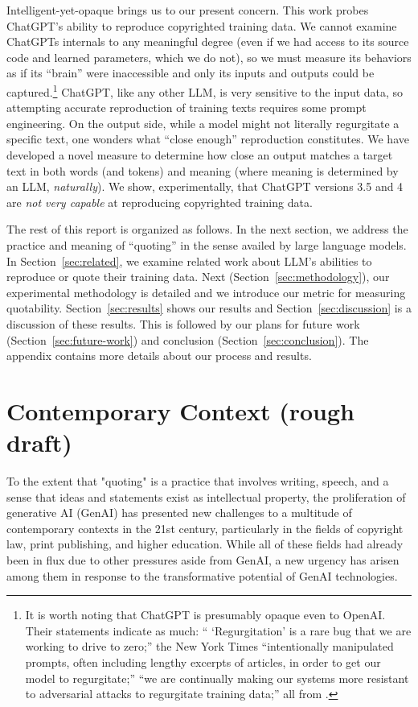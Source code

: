 \documentclass{article}
\begin{document}
Intelligent-yet-opaque brings us to our present concern. This work probes ChatGPT's ability to reproduce copyrighted training data. We cannot examine ChatGPTs internals to any meaningful degree (even if we had access to its source code and learned parameters, which we do not), so we must measure its behaviors as if its ``brain'' were inaccessible and only its inputs and outputs could be captured.\footnote{It is worth noting that ChatGPT is presumably opaque even to OpenAI. Their statements indicate as much: `` `Regurgitation' is a rare bug that we are working to drive to zero;'' the New York Times ``intentionally manipulated prompts, often including lengthy excerpts of articles, in order to get our model to regurgitate;'' ``we are continually making our systems more resistant to adversarial attacks to regurgitate training data;'' all from \cite{openaiOpenAIJournalism}.} ChatGPT, like any other LLM, is very sensitive to the input data, so attempting accurate reproduction of training texts requires some prompt engineering. On the output side, while a model might not literally regurgitate a specific text, one wonders what ``close enough'' reproduction constitutes. We have developed a novel measure to determine how close an output matches a target text in both words (and tokens) and meaning (where meaning is determined by an LLM, \emph{naturally}). We show, experimentally, that ChatGPT versions 3.5 and 4 are \emph{not very capable} at reproducing copyrighted training data.

The rest of this report is organized as follows. In the next section, we address the practice and meaning of ``quoting'' in the sense availed by large language models. In Section~\ref{sec:related}, we examine related work about LLM's abilities to reproduce or quote their training data. Next (Section~\ref{sec:methodology}), our experimental methodology is detailed and we introduce our metric for measuring quotability. Section~\ref{sec:results} shows our results and Section~\ref{sec:discussion} is a discussion of these results. This is followed by our plans for future work (Section~\ref{sec:future-work}) and conclusion (Section~\ref{sec:conclusion}). The appendix contains more details about our process and results.


\section{Contemporary Context (rough draft)}
\label{sec:context}

To the extent that "quoting" is a practice that involves writing, speech, and a sense that ideas and statements exist as intellectual property, the proliferation of generative AI (GenAI) has presented new challenges to a multitude of contemporary contexts in the 21st century, particularly in the fields of copyright law, print publishing, and higher education. While all of these fields had already been in flux due to other pressures aside from GenAI, a new urgency has arisen among them in response to the transformative potential of GenAI technologies. 
\end{document}
